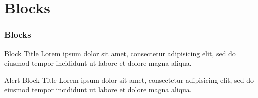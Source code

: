 \section{Blocks}
\label{blocks}
\begin{frame}\frametitle{Blocks}
  \begin{block}{Block Title}
    Lorem ipsum dolor sit amet, consectetur adipisicing elit, sed do eiusmod tempor incididunt ut labore et dolore magna aliqua.
  \end{block}
  \begin{alertblock}{Alert Block Title}
    Lorem ipsum dolor sit amet, consectetur adipisicing elit, sed do eiusmod tempor incididunt ut labore et dolore magna aliqua.
  \end{alertblock}
\end{frame}